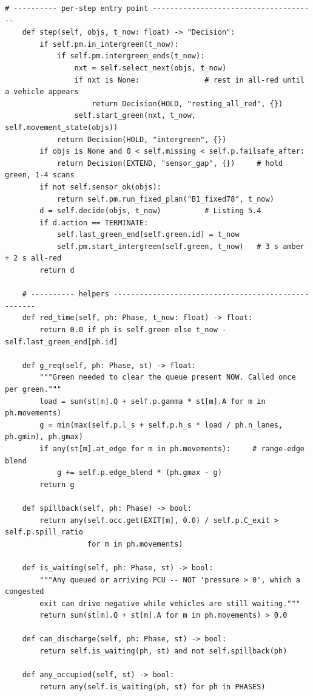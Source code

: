 \begin{lstlisting}[style=py,caption={\texttt{PrismController}: state, phase selection and fail-safe},label={lst:app-prism}]
    # ---------- per-step entry point --------------------------------------
    def step(self, objs, t_now: float) -> "Decision":
        if self.pm.in_intergreen(t_now):
            if self.pm.intergreen_ends(t_now):
                nxt = self.select_next(objs, t_now)
                if nxt is None:               # rest in all-red until a vehicle appears
                    return Decision(HOLD, "resting_all_red", {})
                self.start_green(nxt, t_now, self.movement_state(objs))
            return Decision(HOLD, "intergreen", {})
        if objs is None and 0 < self.missing < self.p.failsafe_after:
            return Decision(EXTEND, "sensor_gap", {})     # hold green, 1-4 scans
        if not self.sensor_ok(objs):
            return self.pm.run_fixed_plan("B1_fixed78", t_now)
        d = self.decide(objs, t_now)          # Listing 5.4
        if d.action == TERMINATE:
            self.last_green_end[self.green.id] = t_now
            self.pm.start_intergreen(self.green, t_now)   # 3 s amber + 2 s all-red
        return d

    # ---------- helpers ----------------------------------------------------
    def red_time(self, ph: Phase, t_now: float) -> float:
        return 0.0 if ph is self.green else t_now - self.last_green_end[ph.id]

    def g_req(self, ph: Phase, st) -> float:
        """Green needed to clear the queue present NOW. Called once per green."""
        load = sum(st[m].Q + self.p.gamma * st[m].A for m in ph.movements)
        g = min(max(self.p.l_s + self.p.h_s * load / ph.n_lanes, ph.gmin), ph.gmax)
        if any(st[m].at_edge for m in ph.movements):     # range-edge blend
            g += self.p.edge_blend * (ph.gmax - g)
        return g

    def spillback(self, ph: Phase) -> bool:
        return any(self.occ.get(EXIT[m], 0.0) / self.p.C_exit > self.p.spill_ratio
                   for m in ph.movements)

    def is_waiting(self, ph: Phase, st) -> bool:
        """Any queued or arriving PCU -- NOT 'pressure > 0', which a congested
        exit can drive negative while vehicles are still waiting."""
        return sum(st[m].Q + st[m].A for m in ph.movements) > 0.0

    def can_discharge(self, ph: Phase, st) -> bool:
        return self.is_waiting(ph, st) and not self.spillback(ph)

    def any_occupied(self, st) -> bool:
        return any(self.is_waiting(ph, st) for ph in PHASES)


\end{lstlisting}
